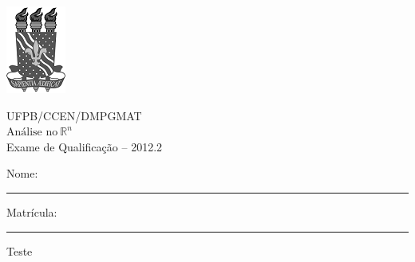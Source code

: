 \documentclass[11pt]{report}
\begin{document}
	\thispagestyle{empty}

	\noindent
	\begin{minipage}[c]{0.2\linewidth}
		\includegraphics{sm-ufpb-logo.png}
	\end{minipage} %
	\begin{minipage}[c]{0.7\linewidth}
		\begin{center}
			UFPB/CCEN/DMPGMAT \\
			$\mbox{Análise no} \ \mathbb{R}^{n}$ \\
			Exame de Qualificação -- 2012.2
		\end{center}
	\end{minipage}

	\vspace{0.8cm}
	
	Nome:\rule{10cm}{0.1mm}
	Matrícula:\rule{3cm}{0.1mm}
	\vspace{1cm}
	
	Teste
\end{document}
